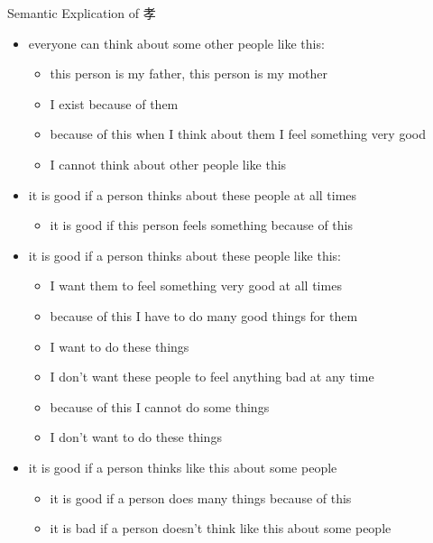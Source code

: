 \documentclass{beamer}
\begin{document}
\begin{frame}{Semantic Explication of 孝 }
    \begin{itemize}
    \item  everyone can think about some other people like this:
      \begin{itemize}
      \item this person is my father, this person is my mother
      \item I exist because of them
      \item because of this when I think about them I feel something very good
      \item  I cannot think about other people like this
      \end{itemize}
    \item it is good if a person thinks about these people at all times
      \begin{itemize}
      \item it is good if this person feels something because of this
      \end{itemize}
    \item it is good if a person thinks about these people like this:
      \begin{itemize}
      \item I want them to feel something very good at all times
      \item because of this I have to do many good things for them
      \item I want to do these things
      \item I don't want these people to feel anything bad at any time
      \item because of this I cannot do some things
      \item I don’t want to do these things
      \end{itemize}
    \item it is good if a person thinks like this about some people
      \begin{itemize}
      \item it is good if a person does many things because of this
      \item it is bad if a person doesn't think like this about some people
      \end{itemize}
    \end{itemize}
  \end{frame}
\end{document}
